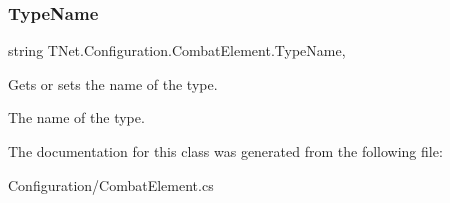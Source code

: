 \subsubsection{\texorpdfstring{Type\+Name}{TypeName}}
{\footnotesize\ttfamily string T\+Net.\+Configuration.\+Combat\+Element.\+Type\+Name\hspace{0.3cm}{\ttfamily [get]}, {\ttfamily [set]}}



Gets or sets the name of the type. 

The name of the type.

The documentation for this class was generated from the following file\+:\begin{DoxyCompactItemize}
\item 
Configuration/Combat\+Element.\+cs\end{DoxyCompactItemize}
